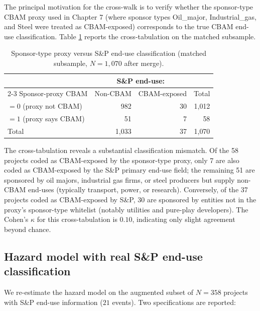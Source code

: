 \documentclass[11pt,a4paper]{article}
\begin{document}
The principal motivation for the cross-walk is to verify whether the sponsor-type CBAM proxy used in Chapter 7 (where sponsor types Oil\_major, Industrial\_gas, and Steel were treated as CBAM-exposed) corresponds to the true CBAM end-use classification. Table \ref{tab:app-proxy-comparison} reports the cross-tabulation on the matched subsample.

\begin{table}[ht]
\centering
\caption{Sponsor-type proxy versus S\&P end-use classification (matched subsample, $N = 1{,}070$ after merge).}
\label{tab:app-proxy-comparison}
\begin{tabular}{lrrr}
\toprule
& \multicolumn{2}{c}{S\&P end-use:} & \\
\cmidrule(lr){2-3}
Sponsor-proxy CBAM & Non-CBAM & CBAM-exposed & Total \\
\midrule
$=0$ (proxy not CBAM) & 982 & 30 & 1{,}012 \\
$=1$ (proxy says CBAM) & 51  & 7  & 58 \\
\midrule
Total & 1{,}033 & 37 & 1{,}070 \\
\bottomrule
\end{tabular}
\end{table}

The cross-tabulation reveals a substantial classification mismatch. Of the 58 projects coded as CBAM-exposed by the sponsor-type proxy, only 7 are also coded as CBAM-exposed by the S\&P primary end-use field; the remaining 51 are sponsored by oil majors, industrial gas firms, or steel producers but supply non-CBAM end-uses (typically transport, power, or research). Conversely, of the 37 projects coded as CBAM-exposed by S\&P, 30 are sponsored by entities not in the proxy's sponsor-type whitelist (notably utilities and pure-play developers). The Cohen's $\kappa$ for this cross-tabulation is $0.10$, indicating only slight agreement beyond chance.

\subsection{Hazard model with real S\&P end-use classification}

We re-estimate the hazard model on the augmented subset of $N = 358$ projects with S\&P end-use information ($21$ events). Two specifications are reported:
\end{document}
